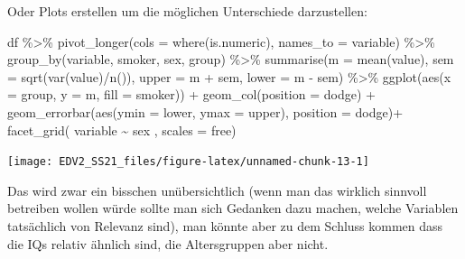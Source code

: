 \documentclass[
]{book}
\newenvironment{Shaded}{\begin{snugshade}}{\end{snugshade}}
\newcommand{\AttributeTok}[1]{\textcolor[rgb]{0.77,0.63,0.00}{#1}}
\newcommand{\FunctionTok}[1]{\textcolor[rgb]{0.00,0.00,0.00}{#1}}
\newcommand{\NormalTok}[1]{#1}
\newcommand{\SpecialCharTok}[1]{\textcolor[rgb]{0.00,0.00,0.00}{#1}}
\newcommand{\StringTok}[1]{\textcolor[rgb]{0.31,0.60,0.02}{#1}}
\begin{document}
Oder Plots erstellen um die möglichen Unterschiede darzustellen:

\begin{Shaded}
\begin{Highlighting}[]
\NormalTok{df }\SpecialCharTok{\%\textgreater{}\%} 
  \FunctionTok{pivot\_longer}\NormalTok{(}\AttributeTok{cols =} \FunctionTok{where}\NormalTok{(is.numeric),}
               \AttributeTok{names\_to =} \StringTok{\textquotesingle{}variable\textquotesingle{}}\NormalTok{) }\SpecialCharTok{\%\textgreater{}\%} 
  \FunctionTok{group\_by}\NormalTok{(variable, smoker, sex, group) }\SpecialCharTok{\%\textgreater{}\%} 
  \FunctionTok{summarise}\NormalTok{(}\AttributeTok{m =} \FunctionTok{mean}\NormalTok{(value),}
            \AttributeTok{sem =} \FunctionTok{sqrt}\NormalTok{(}\FunctionTok{var}\NormalTok{(value)}\SpecialCharTok{/}\FunctionTok{n}\NormalTok{()),}
            \AttributeTok{upper =}\NormalTok{ m }\SpecialCharTok{+}\NormalTok{ sem,}
            \AttributeTok{lower =}\NormalTok{ m }\SpecialCharTok{{-}}\NormalTok{ sem) }\SpecialCharTok{\%\textgreater{}\%} 
  \FunctionTok{ggplot}\NormalTok{(}\FunctionTok{aes}\NormalTok{(}\AttributeTok{x =}\NormalTok{ group,}
             \AttributeTok{y =}\NormalTok{ m,}
             \AttributeTok{fill =}\NormalTok{ smoker)) }\SpecialCharTok{+}
  \FunctionTok{geom\_col}\NormalTok{(}\AttributeTok{position =} \StringTok{\textquotesingle{}dodge\textquotesingle{}}\NormalTok{) }\SpecialCharTok{+}
  \FunctionTok{geom\_errorbar}\NormalTok{(}\FunctionTok{aes}\NormalTok{(}\AttributeTok{ymin =}\NormalTok{ lower,}
                    \AttributeTok{ymax =}\NormalTok{ upper),}
                \AttributeTok{position =} \StringTok{\textquotesingle{}dodge\textquotesingle{}}\NormalTok{)}\SpecialCharTok{+}
  \FunctionTok{facet\_grid}\NormalTok{( variable }\SpecialCharTok{\textasciitilde{}}\NormalTok{ sex , }\AttributeTok{scales =} \StringTok{\textquotesingle{}free\textquotesingle{}}\NormalTok{)}
\end{Highlighting}
\end{Shaded}

\begin{center}\texttt{[image: EDV2\_SS21\_files/figure-latex/unnamed-chunk-13-1]} \end{center}

Das wird zwar ein bisschen unübersichtlich (wenn man das wirklich sinnvoll betreiben wollen würde sollte man sich Gedanken dazu machen, welche Variablen tatsächlich von Relevanz sind), man könnte aber zu dem Schluss kommen dass die IQs relativ ähnlich sind, die Altersgruppen aber nicht.
\end{document}
